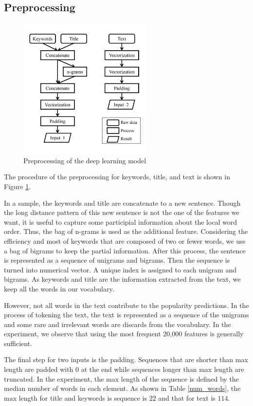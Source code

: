 \subsection{Preprocessing}
\begin{figure}
\centering
\includegraphics[width=0.6\textwidth]{dl_preprocess.png}
\caption{Preprocessing of the deep learning model}
\label{dl_preprocess}
\end{figure}

The procedure of the preprocessing for keywords, title, and text is shown in Figure \ref{dl_preprocess}. 

In a sample, the keywords and title are concatenate to a new sentence. Though the long distance pattern of this new sentence is not the one of the features we want, it is useful to capture some participial information about the local word order. Thus, the bag of n-grams is used as the additional feature. Considering the efficiency and most of keywords that are composed of two or fewer words, we use a bag of bigrams to keep the partial information. After this process, the sentence is represented as a sequence of unigrams and bigrams. Then the sequence is turned into numerical vector. A unique index is assigned to each unigram and bigrams. As keywords and title are the information extracted from the text, we keep all the words in our vocabulary.

However, not all words in the text contribute to the popularity predictions. In the process of tokening the text, the text is represented as a sequence of the unigrams and some rare and irrelevant words are discards from the vocabulary. In the experiment, we observe that using the most frequent 20,000 features is generally sufficient. 

The final step for two inputs is the padding. Sequences that are shorter than max length are padded with $0$ at the end while sequences longer than max length are truncated. In the experiment, the max length of the sequence is defined by the median number of words in each element. As shown in Table \ref{num_words}, the max length for title and keywords is sequence is $22$ and that for text is $114$.

